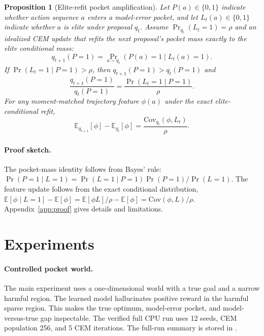 \documentclass{article}
\newtheorem{proposition}{Proposition}
\begin{document}
\begin{proposition}[Elite-refit pocket amplification]
Let $P(a)\in\{0,1\}$ indicate whether action sequence $a$ enters a model-error pocket, and let $L_t(a)\in\{0,1\}$ indicate whether $a$ is elite under proposal $q_t$. Assume $\Pr_{q_t}(L_t=1)=\rho$ and an idealized CEM update that refits the next proposal's pocket mass exactly to the elite conditional mass:
\begin{equation}
q_{t+1}(P=1)=\Pr_{a\sim q_t}(P(a)=1\mid L_t(a)=1).
\end{equation}
If $\Pr(L_t=1\mid P=1)>\rho$, then $q_{t+1}(P=1)>q_t(P=1)$ and
\begin{equation}
\frac{q_{t+1}(P=1)}{q_t(P=1)}
=
\frac{\Pr(L_t=1\mid P=1)}{\rho}.
\end{equation}
For any moment-matched trajectory feature $\phi(a)$ under the exact elite-conditional refit,
\begin{equation}
\mathbb{E}_{q_{t+1}}[\phi]-\mathbb{E}_{q_t}[\phi]
=
\frac{\mathrm{Cov}_{q_t}(\phi,L_t)}{\rho}.
\end{equation}
\end{proposition}

\paragraph{Proof sketch.}
The pocket-mass identity follows from Bayes' rule:
$\Pr(P=1\mid L=1)=\Pr(L=1\mid P=1)\Pr(P=1)/\Pr(L=1)$.
The feature update follows from the exact conditional distribution,
$\mathbb{E}[\phi\mid L=1]-\mathbb{E}[\phi]
=\mathbb{E}[\phi L]/\rho-\mathbb{E}[\phi]
=\mathrm{Cov}(\phi,L)/\rho$. Appendix~\ref{app:proof} gives details and limitations.

\section{Experiments}

\paragraph{Controlled pocket world.}
The main experiment uses a one-dimensional world with a true goal and a narrow harmful region. The learned model hallucinates positive reward in the harmful sparse region. This makes the true optimum, model-error pocket, and model-versus-true gap inspectable. The verified full CPU run uses 12 seeds, CEM population 256, and 5 CEM iterations. The full-run summary is stored in .
\end{document}
